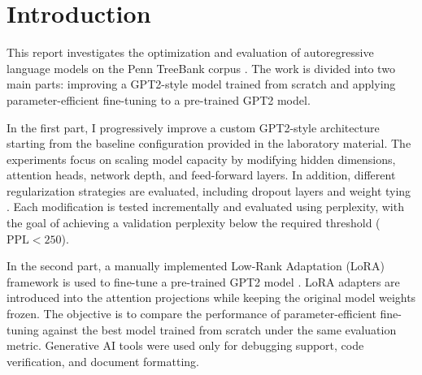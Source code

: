 \section{Introduction}
This report investigates the optimization and evaluation of autoregressive language models on the Penn TreeBank corpus \cite{marcus1993building}. The work is divided into two main parts: improving a GPT2-style model trained from scratch and applying parameter-efficient fine-tuning to a pre-trained GPT2 model.

In the first part, I progressively improve a custom GPT2-style architecture \cite{radford2019language} starting from the baseline configuration provided in the laboratory material. The experiments focus on scaling model capacity by modifying hidden dimensions, attention heads, network depth, and feed-forward layers. In addition, different regularization strategies are evaluated, including dropout layers \cite{srivastava2014dropout} and weight tying \cite{press2016using}. Each modification is tested incrementally and evaluated using perplexity, with the goal of achieving a validation perplexity below the required threshold ($\text{PPL}<250$).

In the second part, a manually implemented Low-Rank Adaptation (LoRA) framework \cite{hu2021lora} is used to fine-tune a pre-trained GPT2 model \cite{radford2019language}. LoRA adapters are introduced into the attention projections while keeping the original model weights frozen. The objective is to compare the performance of parameter-efficient fine-tuning against the best model trained from scratch under the same evaluation metric. Generative AI tools were used only for debugging support, code verification, and document formatting.
